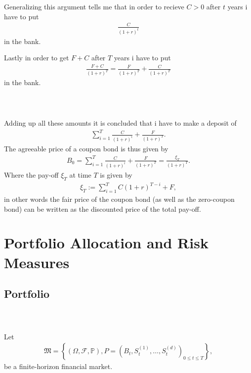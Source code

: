 \documentclass{beamer}
\numberwithin{equation}{section}
\begin{document}
\begin{frame}\frametitle{{\normalsize \secname} \\ {\large \subsecname}}
    Generalizing this argument tells me that in order to recieve $C > 0$ after $t$ years i have to put
    \begin{align}
        \frac{C}{(1+r)^t}
    \end{align}
    in the bank.
    \pause

    Lastly in order to get $F + C$ after $T$ years i have to put
    \begin{align}
        \frac{F + C}{(1+r)^T} = \frac{F}{(1+r)^T} + \frac{C}{(1+r)^T}
    \end{align}
    in the bank.
\end{frame}

\begin{frame}\frametitle{{\normalsize \secname} \\ {\large \subsecname}}
    Adding up all these amounts it is concluded that i have to make a deposit of
    \begin{align}
        \sum_{i = 1}^T \frac{C}{(1 + r)^i} + \frac{F}{(1+r)^T}.
    \end{align}\pause
    The agreeable price of a coupon bond is thus given by
    \begin{align}
        B_0 = 
        \sum_{i = 1}^T \frac{C}{(1 + r)^i} + \frac{F}{(1+r)^T} =
        \frac{\xi_T}{(1 + r)^T}.
    \end{align}\pause
    Where the pay-off $\xi_T$ at time $T$ is given by
    \begin{align}
        \xi_T := \sum_{i = 1}^T C(1 + r)^{T -i} + F,
    \end{align}\pause
    in other words the fair price of the coupon bond (as well as the zero-coupon bond) can be written as the discounted price of the total pay-off.
\end{frame}

\section{Portfolio Allocation and Risk Measures}

\subsection{Portfolio}

\begin{frame}\frametitle{{\normalsize \secname} \\ {\large \subsecname}}
    Let
        \begin{align}
            \mathfrak{M} = \left\{ 
                \left(
                    \Omega, \mathscr{F}, \mathbb{P}
                \right),
                P = \left(
                    B_t, S_t^{(1)}, \ldots, S_t^{(d)}
                \right)_{0 \leq t \leq T}
            \right\},
        \end{align}
        be a finite-horizon financial market.
\end{frame}
\end{document}
